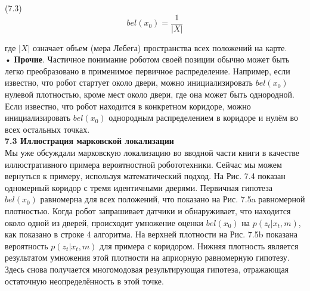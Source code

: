 \documentclass[10pt,a4paper]{article}
\begin{document}
(7.3)
$$bel(x_0)=\frac{1}{|X|}$$

где $|X|$ означает объем (мера Лебега) пространства всех положений на карте.\\

• \textbf{Прочие}. Частичное понимание роботом своей позиции обычно может быть легко преобразовано в применимое первичное распределение. Например, если известно, что робот стартует около двери, можно инициализировать $bel(x_0)$  нулевой плотностью, кроме мест около двери, где она может быть однородной. Если известно, что робот находится в конкретном коридоре, можно инициализировать $bel(x_0)$ однородным распределением в коридоре и нулём во всех остальных точках.\\

\textbf{7.3 Иллюстрация марковской локализации}\\

Мы уже обсуждали марковскую локализацию во вводной части книги в качестве иллюстративного примера вероятностной робототехники. Сейчас мы можем вернуться к примеру, используя математический подход. На Рис. 7.4 показан одномерный коридор с тремя идентичными дверями. Первичная гипотеза $bel(x_0)$ равномерна для всех положений, что показано на Рис. 7.5a равномерной плотностью. Когда робот запрашивает датчики и обнаруживает, что находится около одной из дверей, происходит умножение оценки $bel(x_0)$ на $p(z_t | x_t, m)$, как показано в строке 4 алгоритма. На верхней плотности на Рис. 7.5b показана вероятность $p(z_t | x_t, m)$ для примера с коридором. Нижняя плотность является результатом умножения этой плотности на априорную равномерную гипотезу. Здесь снова получается многомодовая результирующая гипотеза, отражающая остаточную неопределённость в этой точке.
\end{document}

